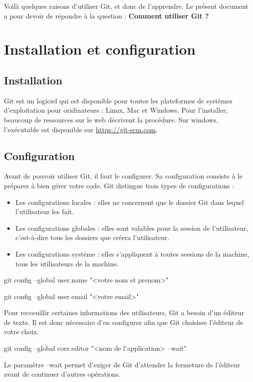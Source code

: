 \documentclass[11pt, a4paper]{book}
\begin{document}
Voilà quelques raisons d’utiliser Git, et donc de l’apprendre. Le présent document a pour devoir de répondre à la question : \textbf{Comment utiliser Git ?}

\chapter{Installation et configuration}
\section{Installation}
Git est un logiciel qui est disponible pour toutes les plateformes de systèmes d'exploitation pour oridinateurs : Linux, Mac et Windows. Pour l'installer, beaucoup de ressources sur le web décrivent la procédure. Sur windows, l'exécutable est disponible sur \url{https://git-scm.com}.
\section{Configuration}
Avant de pouvoir utiliser Git, il faut le configurer. Sa configuration consiste à le préparer à bien gérer votre code. Git distingue trois types de configurations :
\begin{itemize}
\item Les configurations locales : elles ne concernent que le dossier Git dans lequel l'utilisateur les fait.
\item Les configurations globales : elles sont valables pour la session de l'utilisateur, c'est-à-dire tous les dossiers que créera l'utilisateur.
\item Les configurations système : elles s'appliquent à toutes sessions de la machine, tous les utilisateurs de la machine.
\end{itemize}
\begin{bash}
git config --global user.name "<votre nom et prenom>"
\end{bash}
\begin{bash}
git config --global user.email "<votre email>"
\end{bash}

Pour recceuillir certaines informations des utilisateurs, Git a besoin d'un éditeur de texte. Il est donc nécessaire d'en configurer afin que Git choisisse l'éditeur de votre choix.
\begin{bash}
git config --global core.editor "<nom de l'application> --wait"
\end{bash}
Le paramètre --wait permet d'exiger de Git d'attendre la fermeture de l'éditeur avant de continuer d'autres opérations.
\end{document}
